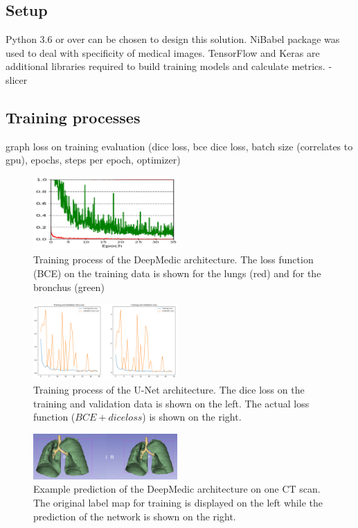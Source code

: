 
\subsection{Setup}

Python 3.6 or over can be chosen to design this solution. NiBabel package was used to deal with specificity of medical images. TensorFlow and Keras are additional libraries required to build training models and calculate metrics.
- slicer

\subsection{Training processes}
graph loss on training evaluation (dice loss, bce dice loss, batch size (correlates to gpu), epochs, steps per epoch, optimizer)

\begin{figure}[h!]
	\includegraphics[width=0.49\textwidth, angle=0]{files/deepmedictrain.png}
	\caption{Training process of the DeepMedic architecture. The loss function (BCE) on the training data is shown for the lungs (red) and for the bronchus (green)}
	\label{train_deepmedic}
\end{figure}


\begin{figure}[h!]
	\includegraphics[width=0.49\textwidth, angle=0]{files/jpgunettrain.png}
	\caption{Training process of the U-Net architecture. The dice loss on the training and validation data is shown on the left. The actual loss function ($BCE + dice loss$) is shown on the right.}
	\label{train_unet}
\end{figure}

\begin{figure}[h!]
	\includegraphics[width=0.49\textwidth, angle=0]{files/preddeepmedic.png}
	\caption{Example prediction of the DeepMedic architecture on one CT scan. The original label map for training is displayed on the left while the prediction of the network is shown on the right.}
	\label{pred_deepmedic}
\end{figure}

